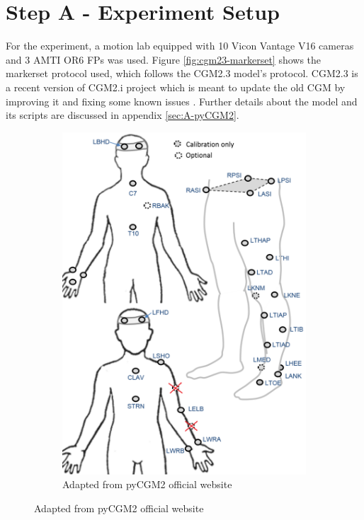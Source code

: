 \documentclass[../main.tex]{subfiles}
\begin{document}
\section{Step A - Experiment Setup}
For the experiment, a motion lab equipped with 10 Vicon Vantage V16 cameras and 3 AMTI OR6 \acp{FP} was used. 
Figure \ref{fig:cgm23-markerset} shows the markerset protocol used, which follows the CGM2.3 model's protocol. 
CGM2.3 is a recent version of CGM2.i project which is meant to update the old \ac{CGM} by improving it and fixing some known issues \cite{Leboeuf2019}. 
Further details about the model and its scripts are discussed in appendix \ref{sec:A-pyCGM2}.
\begin{figure}[!ht]
     \centering
     \begin{subfigure}[t]{0.58\textwidth}
         \centering
         \includegraphics[width=\textwidth]{img/CGM23_markerset.pdf}
         \caption{Adapted from pyCGM2 official website \cite{Leboeuf2019}}

\end{subfigure}
\end{figure}
\end{document}
